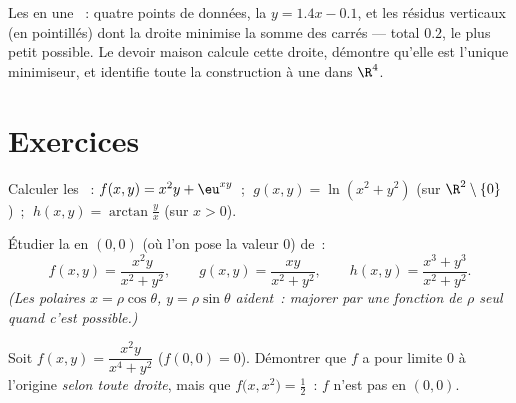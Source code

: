 \begin{omfigure}

{\small Les  en une ~: quatre points de
données, la  $y = 1.4x - 0.1$, et les résidus
verticaux (en pointillés) dont la droite minimise la somme des
carrés --- total $0.2$, le plus petit possible. Le devoir maison
calcule cette droite, démontre qu'elle est l'unique minimiseur, et
identifie toute la construction à une  dans
$\R^4$.}
\end{omfigure}

\section{Exercices}

\begin{exercise}[$\star$]\label{exo:b1:multivar:1}
Calculer les ~:
$f(x,y) = x^2 y + \eu^{xy}$~; $\;g(x,y) = \ln(x^2 + y^2)$ (sur
$\R^2\setminus\{0\}$)~; $\;h(x,y) = \arctan\frac yx$ (sur $x > 0$).
\end{exercise}

\begin{exercise}[$\star$]\label{exo:b1:multivar:2}
Étudier la  en $(0,0)$ (où l'on pose la valeur $0$) de~:
\[
f(x,y) = \frac{x^2 y}{x^2 + y^2},
\qquad
g(x,y) = \frac{xy}{x^2 + y^2},
\qquad
h(x,y) = \frac{x^3 + y^3}{x^2 + y^2}.
\]
\emph{(Les  polaires $x = \rho\cos\theta$, $y =
\rho\sin\theta$ aident~: majorer par une fonction de $\rho$ seul
quand c'est possible.)}
\end{exercise}

\begin{exercise}[$\star\star$]\label{exo:b1:multivar:3}
Soit $f(x,y) = \dfrac{x^2 y}{x^4 + y^2}$ ($f(0,0) = 0$). Démontrer
que $f$ a pour limite $0$ à l'origine \emph{selon toute droite},
mais que $f\bigl(x, x^2\bigr) = \frac12$~: $f$ n'est pas 
en $(0,0)$.
\end{exercise}

